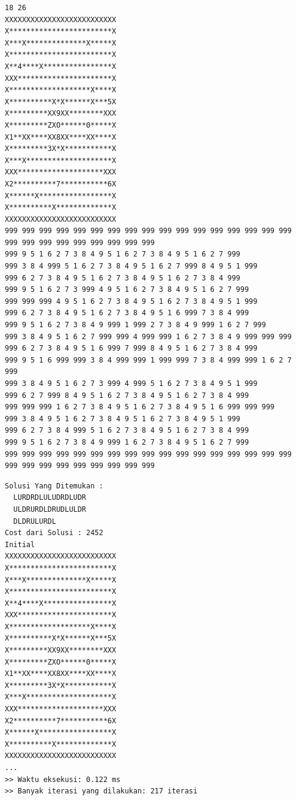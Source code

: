 \documentclass[a4paper,11pt]{article}
\begin{document}
\noindent\begin{minipage}[t]{0.52\textwidth}
\begin{lstlisting}[basicstyle=\ttfamily\tiny, numbers=none, title=Input: test3.txt]
18 26
XXXXXXXXXXXXXXXXXXXXXXXXXX
X************************X
X***X**************X*****X
X************************X
X**4****X****************X
XXX**********************X
X*******************X****X
X**********X*X******X***5X
X*********XX9XX********XXX
X*********ZXO******0*****X
X1**XX****XX8XX****XX****X
X*********3X*X***********X
X***X********************X
XXX********************XXX
X2**********7***********6X
X******X*****************X
X**********X*************X
XXXXXXXXXXXXXXXXXXXXXXXXXX
999 999 999 999 999 999 999 999 999 999 999 999 999 999 999 999 999 999 999 999 999 999 999 999 999 999
999 9 5 1 6 2 7 3 8 4 9 5 1 6 2 7 3 8 4 9 5 1 6 2 7 999
999 3 8 4 999 5 1 6 2 7 3 8 4 9 5 1 6 2 7 999 8 4 9 5 1 999
999 6 2 7 3 8 4 9 5 1 6 2 7 3 8 4 9 5 1 6 2 7 3 8 4 999
999 9 5 1 6 2 7 3 999 4 9 5 1 6 2 7 3 8 4 9 5 1 6 2 7 999
999 999 999 4 9 5 1 6 2 7 3 8 4 9 5 1 6 2 7 3 8 4 9 5 1 999
999 6 2 7 3 8 4 9 5 1 6 2 7 3 8 4 9 5 1 6 999 7 3 8 4 999
999 9 5 1 6 2 7 3 8 4 9 999 1 999 2 7 3 8 4 9 999 1 6 2 7 999
999 3 8 4 9 5 1 6 2 7 999 999 4 999 999 1 6 2 7 3 8 4 9 999 999 999
999 6 2 7 3 8 4 9 5 1 6 999 7 999 8 4 9 5 1 6 2 7 3 8 4 999
999 9 5 1 6 999 999 3 8 4 999 999 1 999 999 7 3 8 4 999 999 1 6 2 7 999
999 3 8 4 9 5 1 6 2 7 3 999 4 999 5 1 6 2 7 3 8 4 9 5 1 999
999 6 2 7 999 8 4 9 5 1 6 2 7 3 8 4 9 5 1 6 2 7 3 8 4 999
999 999 999 1 6 2 7 3 8 4 9 5 1 6 2 7 3 8 4 9 5 1 6 999 999 999
999 3 8 4 9 5 1 6 2 7 3 8 4 9 5 1 6 2 7 3 8 4 9 5 1 999
999 6 2 7 3 8 4 999 5 1 6 2 7 3 8 4 9 5 1 6 2 7 3 8 4 999
999 9 5 1 6 2 7 3 8 4 9 999 1 6 2 7 3 8 4 9 5 1 6 2 7 999
999 999 999 999 999 999 999 999 999 999 999 999 999 999 999 999 999 999 999 999 999 999 999 999 999 999
\end{lstlisting}
\end{minipage}%
\hfill%
\begin{minipage}[t]{0.44\textwidth}
\begin{lstlisting}[basicstyle=\ttfamily\scriptsize, numbers=none, title=Output]
Solusi Yang Ditemukan :
  LURDRDLULUDRDLUDR
  ULDRURDLDRUDLULDR
  DLDRULURDL
Cost dari Solusi : 2452
Initial
XXXXXXXXXXXXXXXXXXXXXXXXXX
X************************X
X***X**************X*****X
X************************X
X**4****X****************X
XXX**********************X
X*******************X****X
X**********X*X******X***5X
X*********XX9XX********XXX
X*********ZXO******0*****X
X1**XX****XX8XX****XX****X
X*********3X*X***********X
X***X********************X
XXX********************XXX
X2**********7***********6X
X******X*****************X
X**********X*************X
XXXXXXXXXXXXXXXXXXXXXXXXXX
...
>> Waktu eksekusi: 0.122 ms
>> Banyak iterasi yang dilakukan: 217 iterasi
\end{lstlisting}
\end{minipage}
\end{document}
